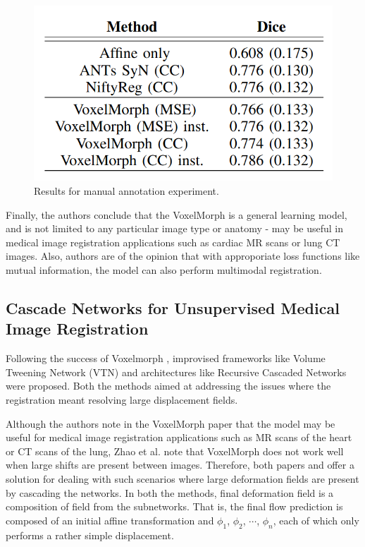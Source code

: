 \documentclass{report}
\begin{document}
	\begin{figure}[H]
		\centering
		\includegraphics[width=0.5\columnwidth]{resources/chapter2/vxm_result_2.png}
		\caption{Results for manual annotation experiment. \cite{Balakrishnan_2019}}
		\label{fig:vxm_result_2}
	\end{figure}
	
	Finally, the authors conclude that the VoxelMorph is a general learning model, and is not limited to any particular image type or anatomy - may be useful in medical image registration applications such as cardiac MR scans or lung CT images. Also, authors are of the opinion that with approporiate loss functions like mutual information, the model can also perform multimodal registration.
	
	\subsection{Cascade Networks for Unsupervised Medical Image Registration}
	Following the success of Voxelmorph \cite{Balakrishnan_2019}, improvised frameworks like Volume Tweening Network (VTN) \cite{8889674} and architectures like Recursive Cascaded Networks \cite{Zhao_2019} were proposed. Both the methods aimed at addressing the issues where the registration meant resolving large displacement fields.
	
	Although the authors note in the VoxelMorph paper \cite{Balakrishnan_2019} that the model may be useful for medical image registration applications such as MR scans of the heart or CT scans of the lung, Zhao et al. \cite{8889674} note that VoxelMorph does not work well when large shifts are present between images. Therefore, both papers \cite{8889674} and \cite{Balakrishnan_2019} offer a solution for dealing with such scenarios where large deformation fields are present by cascading the networks. In both the methods, final deformation field is a composition of field from the subnetworks. That is, the final flow prediction is composed of an initial affine transformation and $\phi_1$, $\phi_2$, $\cdots$, $\phi_n$, each of which only performs a rather simple displacement.
	
\end{document}
